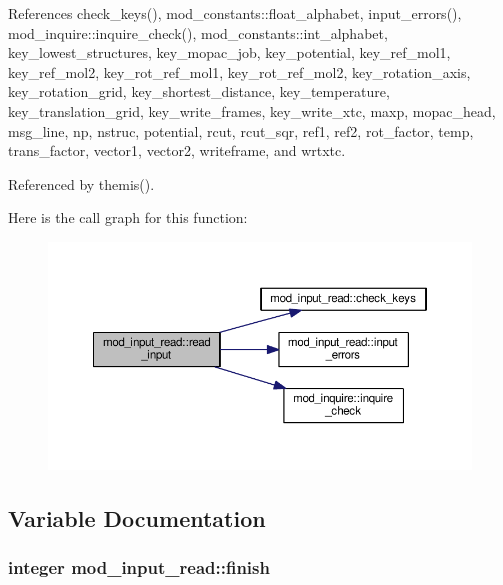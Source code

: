 References check\+\_\+keys(), mod\+\_\+constants\+::float\+\_\+alphabet, input\+\_\+errors(), mod\+\_\+inquire\+::inquire\+\_\+check(), mod\+\_\+constants\+::int\+\_\+alphabet, key\+\_\+lowest\+\_\+structures, key\+\_\+mopac\+\_\+job, key\+\_\+potential, key\+\_\+ref\+\_\+mol1, key\+\_\+ref\+\_\+mol2, key\+\_\+rot\+\_\+ref\+\_\+mol1, key\+\_\+rot\+\_\+ref\+\_\+mol2, key\+\_\+rotation\+\_\+axis, key\+\_\+rotation\+\_\+grid, key\+\_\+shortest\+\_\+distance, key\+\_\+temperature, key\+\_\+translation\+\_\+grid, key\+\_\+write\+\_\+frames, key\+\_\+write\+\_\+xtc, maxp, mopac\+\_\+head, msg\+\_\+line, np, nstruc, potential, rcut, rcut\+\_\+sqr, ref1, ref2, rot\+\_\+factor, temp, trans\+\_\+factor, vector1, vector2, writeframe, and wrtxtc.



Referenced by themis().



Here is the call graph for this function\+:\nopagebreak
\begin{figure}[H]
\begin{center}
\leavevmode
\includegraphics[width=350pt]{namespacemod__input__read_af75d5f3259d3fca6d4fbbcd22059b6bd_cgraph}
\end{center}
\end{figure}




\subsection{Variable Documentation}
\subsubsection[{\texorpdfstring{finish}{finish}}]{\setlength{\rightskip}{0pt plus 5cm}integer mod\+\_\+input\+\_\+read\+::finish}\hypertarget{namespacemod__input__read_af49668c97f27e5589794e545c5be5a22}{}\label{namespacemod__input__read_af49668c97f27e5589794e545c5be5a22}


